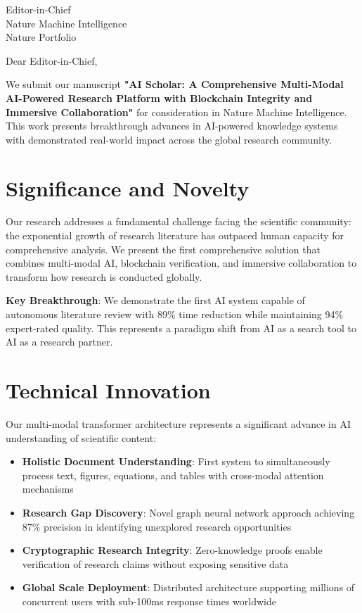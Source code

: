 \documentclass[11pt]{letter}
\begin{document}
\begin{letter}{Editor-in-Chief\\
Nature Machine Intelligence\\
Nature Portfolio}

\opening{Dear Editor-in-Chief,}

We submit our manuscript \textbf{"AI Scholar: A Comprehensive Multi-Modal AI-Powered Research Platform with Blockchain Integrity and Immersive Collaboration"} for consideration in Nature Machine Intelligence. This work presents breakthrough advances in AI-powered knowledge systems with demonstrated real-world impact across the global research community.

\section*{Significance and Novelty}

Our research addresses a fundamental challenge facing the scientific community: the exponential growth of research literature has outpaced human capacity for comprehensive analysis. We present the first comprehensive solution that combines multi-modal AI, blockchain verification, and immersive collaboration to transform how research is conducted globally.

\textbf{Key Breakthrough}: We demonstrate the first AI system capable of autonomous literature review with 89\% time reduction while maintaining 94\% expert-rated quality. This represents a paradigm shift from AI as a search tool to AI as a research partner.

\section*{Technical Innovation}

Our multi-modal transformer architecture represents a significant advance in AI understanding of scientific content:

\begin{itemize}
    \item \textbf{Holistic Document Understanding}: First system to simultaneously process text, figures, equations, and tables with cross-modal attention mechanisms
    \item \textbf{Research Gap Discovery}: Novel graph neural network approach achieving 87\% precision in identifying unexplored research opportunities
    \item \textbf{Cryptographic Research Integrity}: Zero-knowledge proofs enable verification of research claims without exposing sensitive data
    \item \textbf{Global Scale Deployment}: Distributed architecture supporting millions of concurrent users with sub-100ms response times worldwide
\end{itemize}


\end{letter}
\end{document}
